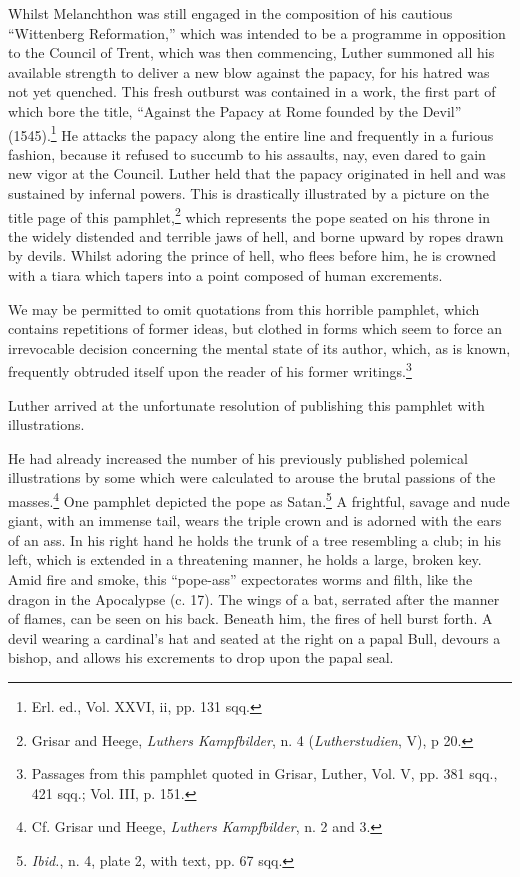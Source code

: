 Whilst Melanchthon was still engaged in the composition of his
cautious “Wittenberg Reformation,” which was intended to be a
programme in opposition to the Council of Trent, which was then
commencing, Luther summoned all his available strength to deliver
a new blow against the papacy, for his hatred was not yet quenched.
This fresh outburst was contained in a work, the first part of which
bore the title, “Against the Papacy at Rome founded by the Devil”
(1545).\footnote{Erl. ed., Vol. XXVI, ii, pp. 131 sqq.}
 He attacks the papacy along the entire line and frequently
in a furious fashion, because it refused to succumb to his assaults,
nay, even dared to gain new vigor at the Council. Luther held that
the papacy originated in hell and was sustained by infernal powers.
This is drastically illustrated by a picture on the title page of this
pamphlet,\footnote{Grisar and Heege, \textit{Luthers Kampfbilder}, n. 4 (\textit{Lutherstudien}, V), p 20.}
 which represents the pope seated on his throne in the
widely distended and terrible jaws of hell, and borne upward by ropes
drawn by devils. Whilst adoring the prince of hell, who flees before
him, he is crowned with a tiara which tapers into a point composed of
human excrements.

We may be permitted to omit quotations from this horrible pamphlet,
which contains repetitions of former ideas, but clothed in forms
which seem to force an irrevocable decision concerning the mental
state of its author, which, as is known, frequently obtruded itself
upon the reader of his former writings.\footnote
{Passages from this pamphlet quoted in Grisar, Luther, Vol. V, pp. 381 sqq., 421 sqq.;
Vol. III, p. 151.}

Luther arrived at the unfortunate resolution of publishing this
pamphlet with illustrations.

He had already increased the number of his previously published polemical
illustrations by some which were calculated to arouse the brutal passions of
the masses.\footnote{Cf. Grisar und Heege, \textit{Luthers Kampfbilder}, n. 2
and 3.} One pamphlet depicted the pope as Satan.\footnote{\textit{Ibid.}, n. 4,
plate 2, with text, pp. 67 sqq.} A frightful, savage and nude giant, with an
immense tail, wears the triple crown and is adorned with the ears of an ass. In
his right hand he holds the trunk of a tree resembling a club; in his left,
which is extended in a threatening manner, he holds a large, broken key. Amid
fire and smoke, this ``pope-ass'' expectorates worms and filth, like the dragon
in the Apocalypse (c. 17). The wings of a bat, serrated after the manner of
flames, can be seen on his back. Beneath him, the fires of hell burst forth. A
devil wearing a cardinal’s hat and seated at the right on a papal Bull, devours
a bishop, and allows his excrements to drop upon the papal seal.

